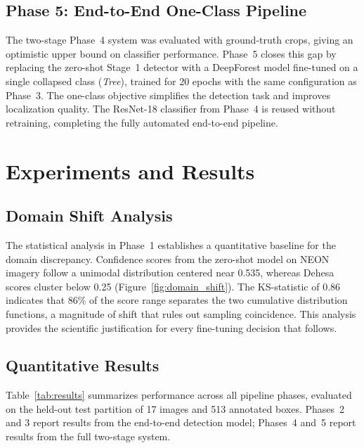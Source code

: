 \documentclass[10pt,twocolumn]{article}
\begin{document}
\subsection{Phase 5: End-to-End One-Class Pipeline}

The two-stage Phase~4 system was evaluated with ground-truth crops, giving
an optimistic upper bound on classifier performance. Phase~5 closes this
gap by replacing the zero-shot Stage~1 detector with a DeepForest model
fine-tuned on a single collapsed class (\textit{Tree}), trained for 20
epochs with the same configuration as Phase~3. The one-class objective
simplifies the detection task and improves localization quality. The
ResNet-18 classifier from Phase~4 is reused without retraining, completing
the fully automated end-to-end pipeline.

\section{Experiments and Results}
\label{sec:experiments}

\subsection{Domain Shift Analysis}

The statistical analysis in Phase~1 establishes a quantitative baseline
for the domain discrepancy. Confidence scores from the zero-shot model
on NEON imagery follow a unimodal distribution centered near 0.535, whereas
Dehesa scores cluster below 0.25 (Figure~\ref{fig:domain_shift}). The
KS-statistic of 0.86 indicates that 86\% of the score range separates the
two cumulative distribution functions, a magnitude of shift that rules out
sampling coincidence. This analysis provides the scientific justification
for every fine-tuning decision that follows.

\subsection{Quantitative Results}

Table~\ref{tab:results} summarizes performance across all pipeline phases,
evaluated on the held-out test partition of 17 images and 513 annotated boxes.
Phases~2 and 3 report results from the end-to-end detection model; Phases~4
and~5 report results from the full two-stage system.
\end{document}

